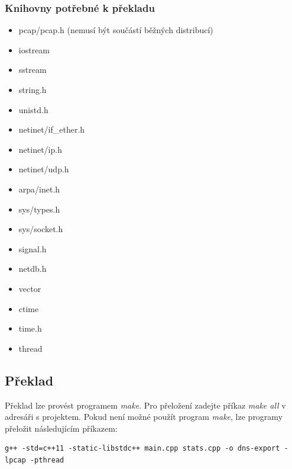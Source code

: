 \documentclass[11pt,a4paper]{article}
\begin{document}
\subsubsection*{Knihovny potřebné k překladu}
\begin{itemize}
	\item pcap/pcap.h (nemusí být součástí běžných distribucí)
	\item iostream
	\item sstream
	\item string.h
	\item unistd.h
	\item netinet/if\_ether.h
	\item netinet/ip.h
	\item netinet/udp.h
	\item arpa/inet.h
	\item sys/types.h
	\item sys/socket.h
	\item signal.h
	\item netdb.h
	\item vector
	\item ctime
	\item time.h
	\item thread
\end{itemize}

\subsection{Překlad}
Překlad lze provést programem \textit{make}. Pro přeložení zadejte příkaz \textit{make all} v adresáři s projektem. Pokud není možné použít program \textit{make}, lze programy přeložit následujícím příkazem:
\begin{lstlisting}
g++ -std=c++11 -static-libstdc++ main.cpp stats.cpp -o dns-export -lpcap -pthread
\end{lstlisting}
\end{document}
